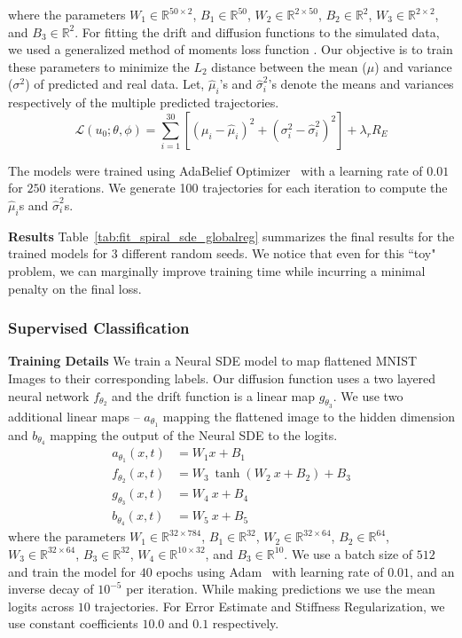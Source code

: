where the parameters $W_1 \in \mathbb{R}^{50 \times 2}$, $B_1 \in \mathbb{R}^{50}$, $W_2 \in \mathbb{R}^{2 \times 50}$, $B_2 \in \mathbb{R}^{2}$, $W_3 \in \mathbb{R}^{2 \times 2}$, and $B_3 \in \mathbb{R}^{2}$. For fitting the drift and diffusion functions to the simulated data, we used a generalized method of moments loss function \citep{luck2016generalized,jeisman2006estimation}. Our objective is to train these parameters to minimize the $L_2$ distance between the mean ($\mu$) and variance ($\sigma^2$) of predicted and real data. Let, $\hat{\mu}_i$'s and $\hat{\sigma}^2_i$'s denote the means and variances respectively of the multiple predicted trajectories.
\begin{equation}
  \mathcal{L}(u_0; \theta, \phi) = \sum_{i = 1}^{30} \left[(\mu_i - \hat{\mu}_i)^2 + (\sigma^2_i - \hat{\sigma}^2_i)^2\right] + \lambda_r R_E
\end{equation}

The models were trained using AdaBelief Optimizer~\citep{zhuang2020adabelief} with a learning rate of $0.01$ for $250$ iterations. We generate 100 trajectories for each iteration to compute the $\hat{\mu}_i$s and $\hat{\sigma}^2_i$s.

\textbf{Results} Table~\ref{tab:fit_spiral_sde_globalreg} summarizes the final results for the trained models for 3 different random seeds. We notice that even for this ``toy" problem, we can marginally improve training time while incurring a minimal penalty on the final loss.

\subsubsection{Supervised Classification}
\label{subsec:classificationsde}

\textbf{Training Details} We train a Neural SDE model to map flattened MNIST Images to their corresponding labels. Our diffusion function uses a two layered neural network $f_{\theta_2}$ and the drift function is a linear map $g_{\theta_3}$. We use two additional linear maps -- $a_{\theta_1}$ mapping the flattened image to the hidden dimension and $b_{\theta_4}$ mapping the output of the Neural SDE to the logits.
%
\begin{align}
  a_{\theta_1}(x, t) & = W_1 x + B_1                      \\
  f_{\theta_2}(x, t) & = W_3 ~ \tanh(W_2 ~ x + B_2) + B_3 \\
  g_{\theta_3}(x, t) & = W_4 ~ x + B_4                    \\
  b_{\theta_4}(x, t) & = W_5 ~ x + B_5
\end{align}
%
where the parameters $W_1 \in \mathbb{R}^{32 \times 784}$, $B_1 \in \mathbb{R}^{32}$, $W_2 \in \mathbb{R}^{32 \times 64}$, $B_2 \in \mathbb{R}^{64}$, $W_3 \in \mathbb{R}^{32 \times 64}$, $B_3 \in \mathbb{R}^{32}$, $W_4 \in \mathbb{R}^{10 \times 32}$, and $B_3 \in \mathbb{R}^{10}$. We use a batch size of $512$ and train the model for $40$ epochs using Adam~\citep{kingma2017adam} with learning rate of $0.01$, and an inverse decay of $10^{-5}$ per iteration. While making predictions we use the mean logits across $10$ trajectories. For Error Estimate and Stiffness Regularization, we use constant coefficients $10.0$ and $0.1$ respectively.

